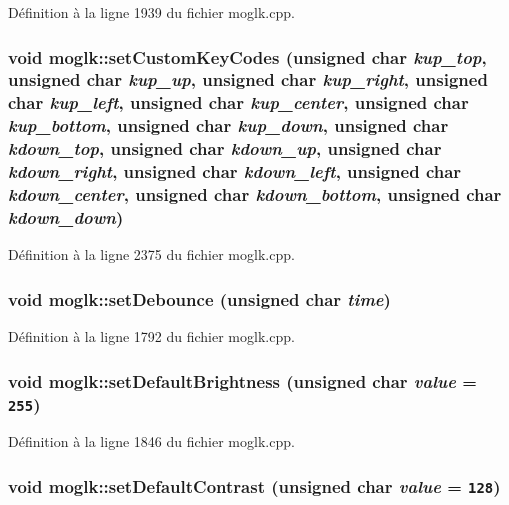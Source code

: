 Définition à la ligne 1939 du fichier moglk.cpp.\hypertarget{classmoglk_fbe1a25a8d461d02dd84df8b7a8b796b}{
\subsubsection[{setCustomKeyCodes}]{\setlength{\rightskip}{0pt plus 5cm}void moglk::setCustomKeyCodes (unsigned char {\em kup\_\-top}, \/  unsigned char {\em kup\_\-up}, \/  unsigned char {\em kup\_\-right}, \/  unsigned char {\em kup\_\-left}, \/  unsigned char {\em kup\_\-center}, \/  unsigned char {\em kup\_\-bottom}, \/  unsigned char {\em kup\_\-down}, \/  unsigned char {\em kdown\_\-top}, \/  unsigned char {\em kdown\_\-up}, \/  unsigned char {\em kdown\_\-right}, \/  unsigned char {\em kdown\_\-left}, \/  unsigned char {\em kdown\_\-center}, \/  unsigned char {\em kdown\_\-bottom}, \/  unsigned char {\em kdown\_\-down})}}
\label{classmoglk_fbe1a25a8d461d02dd84df8b7a8b796b}




Définition à la ligne 2375 du fichier moglk.cpp.\hypertarget{classmoglk_39a75ecd8ae42aedc0c6fa94e29da5e2}{
\subsubsection[{setDebounce}]{\setlength{\rightskip}{0pt plus 5cm}void moglk::setDebounce (unsigned char {\em time})}}
\label{classmoglk_39a75ecd8ae42aedc0c6fa94e29da5e2}




Définition à la ligne 1792 du fichier moglk.cpp.\hypertarget{classmoglk_2a1af82f5cef9e807e43e2a9fa2636e2}{
\subsubsection[{setDefaultBrightness}]{\setlength{\rightskip}{0pt plus 5cm}void moglk::setDefaultBrightness (unsigned char {\em value} = {\tt 255})}}
\label{classmoglk_2a1af82f5cef9e807e43e2a9fa2636e2}




Définition à la ligne 1846 du fichier moglk.cpp.\hypertarget{classmoglk_665a6e5ce6e0ba5b49a888e048bd4541}{
\subsubsection[{setDefaultContrast}]{\setlength{\rightskip}{0pt plus 5cm}void moglk::setDefaultContrast (unsigned char {\em value} = {\tt 128})}}
\label{classmoglk_665a6e5ce6e0ba5b49a888e048bd4541}




